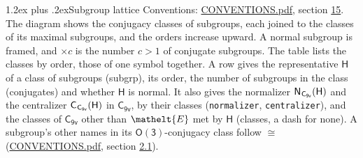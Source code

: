 \documentclass[10pt,a4paper]{article}
\makeatletter
\renewcommand\section{\@startsection{section}{1}{\z@}{-3ex plus -1ex minus -.2ex}%
  {1.2ex plus .2ex}{\normalfont\large\sffamily\bfseries\color{parttitle}}}
\numberwithin{equation}{section}
\newcommand{\eltfont}[1]{{\let\sigma\eltsigma\mathelt{#1}}}
\newcommand{\grp}[1]{\mathsf{#1}}
\newcommand{\cls}[1]{\eltfont{#1}}
\newcommand{\samecls}{\cong}
\newcommand{\nconj}[1]{{\scriptsize$\times#1$}}
\newcommand{\hairsp}{\mkern1mu}
\makeatother
\begin{document}
\section{Subgroup lattice}\label{s:subgroups}
Conventions: \href{../../CONVENTIONS.pdf}{CONVENTIONS.pdf}, section \href{../../CONVENTIONS.pdf\#conv.15}{15}.
The diagram shows the conjugacy classes of subgroups, each joined to the classes of its maximal subgroups, and the orders increase upward. A normal subgroup is framed, and ${\times}c$ is the number $c > 1$ of conjugate subgroups. The table lists the classes by order, those of one symbol together. \label{n:group.H}\label{n:head.subgroup}\label{n:head.order}\label{n:head.conjugates}\label{n:head.normal}A row gives the representative $\grp{H}$ of a class of subgroups (subgrp), its order, the number of subgroups in the class (conjugates) and whether $\grp{H}$ is normal. \label{n:group.normalizer}\label{n:group.centralizer}\label{n:head.classes}It also gives the normalizer $\grp{N}_{\hairsp \grp{C_{9v}}}(\grp{H})$ and the centralizer $\grp{C}_{\hairsp \grp{C_{9v}}}(\grp{H})$ in $\grp{C_{9v}}$, by their classes (\texttt{normalizer}, \texttt{centralizer}), and the classes of $\grp{C_{9v}}$ other than $\cls{E}$ met by $\grp{H}$ (classes, a dash for none). A subgroup's other names in its \href{O3.pdf}{$\grp{O(3)}$}-conjugacy class follow $\samecls$ (\href{../../CONVENTIONS.pdf}{CONVENTIONS.pdf}, section \href{../../CONVENTIONS.pdf\#conv.2.1}{2.1}).
\begin{center}
\end{center}
\end{document}
